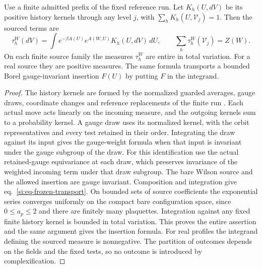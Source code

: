 \documentclass[11pt,letterpaper,reqno]{amsart}
\makeatletter
\numberwithin{equation}{section}
\renewcommand{\eqref}[1]{\textup{eq.~\ref{#1}}}
\theoremstyle{definition}
\newcommand{\ms@minorstart}{%
  \pushQED{\qed}\renewcommand{\qedsymbol}{$\blacksquare$}}
\newenvironment{proposition}[1][]{\ms@minorstart\ms@proposition[#1]}
  {\popQED\endms@proposition}
\theoremstyle{remark}
\makeatother
\begin{document}
\begin{samepage}
\begin{proposition}[Transport of the bare source]\label{si:prop-frozen-transport}
Use a finite admitted prefix of the fixed reference run. Let
$K_h(U,dV)$ be its positive history kernels through any level $j$,
with $\sum_h K_h(U,\mathcal V_j)=1$. Then the sourced terms are
\begin{equation}\label{si:eq-frozen-transport}
 \tau_h^W(dV)=\int e^{-\beta A(U)}e^{A(W,U)}K_h(U,dV)\,dU,
 \qquad \sum_h\tau_h^W(\mathcal V_j)=Z(W).
\end{equation}
On each finite source family the measures $\tau_h^W$ are entire in
total variation. For a real source they are positive measures. The
same formula transports a bounded Borel gauge-invariant insertion
$F(U)$ by putting $F$ in the integrand.
\end{proposition}
\end{samepage}
\begin{proof}
The history kernels are formed by the normalized guarded averages,
gauge draws, coordinate changes and reference replacements of the
finite run \cite{RT}. Each actual move acts linearly on the incoming
measure, and the outgoing kernels sum to a probability kernel. A
gauge draw uses its normalized kernel, with the orbit representatives
and every test retained in their order. Integrating the draw against
its input gives the gauge-weight formula when that input is invariant
under the gauge subgroup of the draw. For this identification use the actual retained-gauge equivariance
at each draw, which preserves invariance of the weighted incoming
term under that draw subgroup. The bare Wilson source and the
allowed insertion are gauge invariant. Composition
and integration give \eqref{si:eq-frozen-transport}. On bounded
sets of source coefficients the exponential series converges uniformly
on the compact bare configuration space, since $0\le a_p\le2$ and
there are finitely many plaquettes. Integration against any fixed
finite history kernel is bounded in total variation. This proves the
entire assertion and the same argument gives the insertion formula.
For real profiles the integrand defining the sourced measure is
nonnegative. The partition of outcomes depends on the fields and
the fixed tests, so no outcome is introduced by complexification.
\end{proof}
\end{document}
